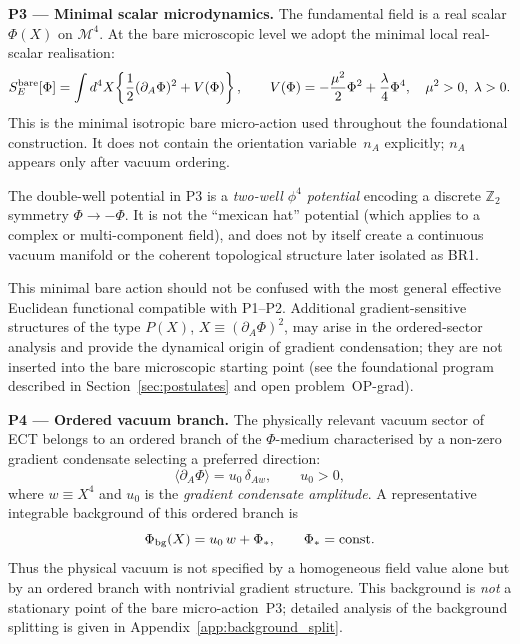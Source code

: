 \documentclass[11pt,a4paper]{article}
\numberwithin{equation}{section}
\begin{document}
\medskip
\noindent\textbf{P3 --- Minimal scalar microdynamics.}
\label{eq:P3}
The fundamental field is a real scalar $\Phi(X)$ on $\mathcal{M}^4$.
At the bare microscopic level we adopt the minimal local real-scalar
realisation:
\begin{equation}
  \label{eq:ECT_action}
  S_E^{\rm bare}[\Phi] = \int d^4X\!\left\{
    \frac{1}{2}(\partial_A\Phi)^2 + V(\Phi)
  \right\},
  \qquad
  V(\Phi) = -\frac{\mu^2}{2}\Phi^2 + \frac{\lambda}{4}\Phi^4,
  \quad \mu^2>0,\;\lambda>0.
\end{equation}
This is the minimal isotropic bare micro-action used throughout the
foundational construction. It does not contain the orientation
variable~$n_A$ explicitly; $n_A$ appears only after vacuum ordering.

The double-well potential in P3 is a \emph{two-well $\phi^4$ potential}
encoding a discrete $\mathbb{Z}_2$ symmetry $\Phi\to-\Phi$.
It is not the ``mexican hat'' potential (which applies to a complex or
multi-component field), and does not by itself create a continuous
vacuum manifold or the coherent topological structure later isolated as BR1.

This minimal bare action should not be confused with the most general
effective Euclidean functional compatible with P1--P2. Additional
gradient-sensitive structures of the type
$P(X)$, $X\equiv(\partial_A\Phi)^2$, may arise in the ordered-sector
analysis and provide the dynamical origin of gradient condensation;
they are not inserted into the bare microscopic starting point
(see the foundational program described in
Section~\ref{sec:postulates} and open problem~OP-grad).

\medskip
\noindent\textbf{P4 --- Ordered vacuum branch.}
\label{eq:P4}
The physically relevant vacuum sector of ECT belongs to an ordered
branch of the $\Phi$-medium characterised by a non-zero gradient
condensate selecting a preferred direction:
\begin{equation}
  \label{eq:gradient_condensate}
  \langle\partial_A\Phi\rangle = u_0\,\delta_{Aw},
  \qquad u_0 > 0,
\end{equation}
where $w\equiv X^4$ and $u_0$ is the \emph{gradient condensate amplitude}.
A representative integrable background of this ordered branch is
\begin{equation}
  \label{eq:background}
  \Phi_{\rm bg}(X) = u_0\,w + \Phi_*,\qquad \Phi_*=\text{const}.
\end{equation}
Thus the physical vacuum is not specified by a homogeneous field value
alone but by an ordered branch with nontrivial gradient structure.
This background is \emph{not} a stationary point of the bare
micro-action~P3; detailed analysis of the background splitting is given
in Appendix~\ref{app:background_split}.
\end{document}
